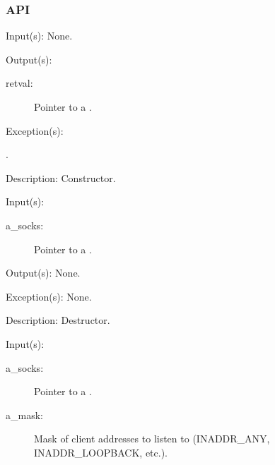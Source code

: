 \subsubsection{API}
\begin{capi}
\label{socks_new}
	\begin{capilist}
	\item[Input(s): ] None.
	\item[Output(s): ]
		\begin{description}\item[]
		\item[retval: ]
			Pointer to a .
		\end{description}
	\item[Exception(s): ]
		\begin{description}\item[]
		\item[.]
		\end{description}
	\item[Description: ]
		Constructor.
	\end{capilist}
\label{socks_delete}
	\begin{capilist}
	\item[Input(s): ]
		\begin{description}\item[]
		\item[a\_socks: ]
			Pointer to a \classname{socks}.
		\end{description}
	\item[Output(s): ] None.
	\item[Exception(s): ] None.
	\item[Description: ]
		Destructor.
	\end{capilist}
\label{socks_listen}
	\begin{capilist}
	\item[Input(s): ]
		\begin{description}\item[]
		\item[a\_socks: ]
			Pointer to a .
		\item[a\_mask: ]
			Mask of client addresses to listen to (INADDR\_ANY,
			INADDR\_LOOPBACK, etc.).

\end{description}
\end{capilist}
\end{capi}
